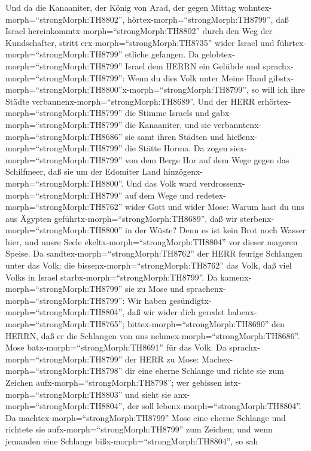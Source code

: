  Und da die Kanaaniter, der König von Arad, der gegen Mittag
wohntex-morph=``strongMorph:TH8802'',
hörtex-morph=``strongMorph:TH8799'', daß Israel
hereinkommtx-morph=``strongMorph:TH8802'' durch den Weg der
Kundschafter, stritt erx-morph=``strongMorph:TH8735'' wider Israel und
führtex-morph=``strongMorph:TH8799'' etliche gefangen.  Da
gelobtex-morph=``strongMorph:TH8799'' Israel dem HERRN ein Gelübde und
sprachx-morph=``strongMorph:TH8799'': Wenn du dies Volk unter Meine Hand
gibstx-morph=``strongMorph:TH8800''x-morph=``strongMorph:TH8799'', so
will ich ihre Städte verbannenx-morph=``strongMorph:TH8689''.
 Und der HERR erhörtex-morph=``strongMorph:TH8799'' die
Stimme Israels und gabx-morph=``strongMorph:TH8799'' die Kanaaniter, und
sie verbanntenx-morph=``strongMorph:TH8686'' sie samt ihren Städten und
hießenx-morph=``strongMorph:TH8799'' die Stätte Horma.  Da
zogen siex-morph=``strongMorph:TH8799'' von dem Berge Hor auf dem Wege
gegen das Schilfmeer, daß sie um der Edomiter Land
hinzögenx-morph=``strongMorph:TH8800''. Und das Volk ward
verdrossenx-morph=``strongMorph:TH8799'' auf dem Wege  und
redetex-morph=``strongMorph:TH8762'' wider Gott und wider Mose: Warum
hast du uns aus Ägypten geführtx-morph=``strongMorph:TH8689'', daß wir
sterbenx-morph=``strongMorph:TH8800'' in der Wüste? Denn es ist kein
Brot noch Wasser hier, und unsre Seele
ekeltx-morph=``strongMorph:TH8804'' vor dieser mageren Speise.
 Da sandtex-morph=``strongMorph:TH8762'' der HERR feurige
Schlangen unter das Volk; die bissenx-morph=``strongMorph:TH8762'' das
Volk, daß viel Volks in Israel starbx-morph=``strongMorph:TH8799''.
 Da kamenx-morph=``strongMorph:TH8799'' sie zu Mose und
sprachenx-morph=``strongMorph:TH8799'': Wir haben
gesündigtx-morph=``strongMorph:TH8804'', daß wir wider dich geredet
habenx-morph=``strongMorph:TH8765''; bittex-morph=``strongMorph:TH8690''
den HERRN, daß er die Schlangen von uns
nehmex-morph=``strongMorph:TH8686''. Mose
batx-morph=``strongMorph:TH8691'' für das Volk.  Da
sprachx-morph=``strongMorph:TH8799'' der HERR zu Mose:
Machex-morph=``strongMorph:TH8798'' dir eine eherne Schlange und richte
sie zum Zeichen aufx-morph=``strongMorph:TH8798''; wer gebissen
istx-morph=``strongMorph:TH8803'' und sieht sie
anx-morph=``strongMorph:TH8804'', der soll
lebenx-morph=``strongMorph:TH8804''.  Da
machtex-morph=``strongMorph:TH8799'' Mose eine eherne Schlange und
richtete sie aufx-morph=``strongMorph:TH8799'' zum Zeichen; und wenn
jemanden eine Schlange bißx-morph=``strongMorph:TH8804'', so sah
